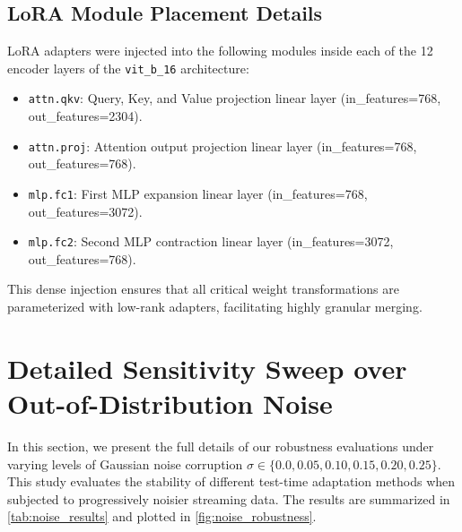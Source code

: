\documentclass{article}
\begin{document}
\subsection{LoRA Module Placement Details}
LoRA adapters were injected into the following modules inside each of the 12 encoder layers of the \texttt{vit\_b\_16} architecture:
\begin{itemize}
    \item \texttt{attn.qkv}: Query, Key, and Value projection linear layer (in\_features=768, out\_features=2304).
    \item \texttt{attn.proj}: Attention output projection linear layer (in\_features=768, out\_features=768).
    \item \texttt{mlp.fc1}: First MLP expansion linear layer (in\_features=768, out\_features=3072).
    \item \texttt{mlp.fc2}: Second MLP contraction linear layer (in\_features=3072, out\_features=768).
\end{itemize}
This dense injection ensures that all critical weight transformations are parameterized with low-rank adapters, facilitating highly granular merging.

\section{Detailed Sensitivity Sweep over Out-of-Distribution Noise}
\label{app:noise_sweep}
In this section, we present the full details of our robustness evaluations under varying levels of Gaussian noise corruption $\sigma \in \{0.0, 0.05, 0.10, 0.15, 0.20, 0.25\}$. This study evaluates the stability of different test-time adaptation methods when subjected to progressively noisier streaming data. The results are summarized in \cref{tab:noise_results} and plotted in \cref{fig:noise_robustness}.
\end{document}
